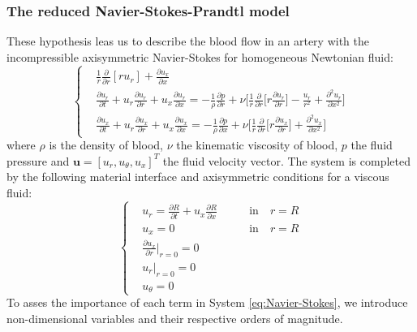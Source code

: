 \documentclass[12pt,a4paper]{article}
\numberwithin{equation}{section}
\begin{document}
\subsubsection{The reduced Navier-Stokes-Prandtl model}
These hypothesis leas us to describe the blood flow in an artery with the incompressible axisymmetric Navier-Stokes for homogeneous Newtonian fluid:
\begin{equation} \label{eq:Navier-Stokes}
  \left\{
      \begin{aligned}
       & \frac{1}{r}\frac{\partial}{\partial r}[ru_r]+\frac{\partial u_x}{\partial x}\\
       & \frac{\partial u_r}{\partial t}+u_r\frac{\partial u_r}{\partial r}+u_x\frac{\partial u_r}{\partial x} = -\frac{1}{\rho}\frac{\partial p}{\partial r}+\nu \Bigg[\frac{1}{r}\frac{\partial}{\partial r}\Bigg[r \frac{\partial u_r}{\partial r}\Bigg] - \frac{u_r}{r^2} + \frac{\partial^2 u_r}{\partial x^2}\Bigg]\\
       & \frac{\partial u_x}{\partial t}+u_r\frac{\partial u_x}{\partial r}+u_x\frac{\partial u_x}{\partial x} = -\frac{1}{\rho}\frac{\partial p}{\partial x}+\nu \Bigg[\frac{1}{r}\frac{\partial}{\partial r}\Bigg[r \frac{\partial u_x}{\partial r}\Bigg] + \frac{\partial^2 u_x}{\partial x^2}\Bigg]
      \end{aligned}
    \right.
\end{equation}
where $\rho$ is the density of blood, $\nu$ the kinematic viscosity of blood, $p$ the fluid pressure and $\boldsymbol{u} = [u_r, u_\theta, u_x]^T$ the fluid velocity vector. The system is completed by the following material interface and axisymmetric conditions for a viscous fluid:
\begin{equation}
  \left\{
      \begin{aligned}
       & u_r = \frac{\partial R}{\partial t}+ u_x\frac{\partial R}{\partial x} &\qquad \textrm{in}\quad r = R\\
       & u_x = 0 &\qquad \textrm{in}\quad r = R\\
       & \frac{\partial u_x}{\partial r} \Bigg|_{r = 0} = 0 \\
       & u_r \big|_{r=0}=0\\
       & u_\theta =0
      \end{aligned}
    \right.
\end{equation}
To asses the importance of each term in System \ref{eq:Navier-Stokes}, we introduce non-dimensional variables and their respective orders of magnitude.
\begin{table}[h!]
\centering
{}
\end{table}
\end{document}
